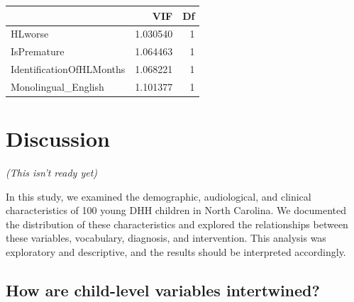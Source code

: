 \documentclass[english,man]{apa6}
\begin{document}
\begin{table}[H]
\centering
\begin{tabular}{l|r|r}
\hline
  & VIF & Df\\
\hline
HLworse & 1.030540 & 1\\
\hline
IsPremature & 1.064463 & 1\\
\hline
IdentificationOfHLMonths & 1.068221 & 1\\
\hline
Monolingual\_English & 1.101377 & 1\\
\hline
\end{tabular}
\end{table}

\hypertarget{discussion}{%
\section{Discussion}\label{discussion}}

\emph{(This isn't ready yet)}

In this study, we examined the demographic, audiological, and clinical characteristics of 100 young DHH children in North Carolina. We documented the distribution of these characteristics and explored the relationships between these variables, vocabulary, diagnosis, and intervention. This analysis was exploratory and descriptive, and the results should be interpreted accordingly.

\hypertarget{how-are-child-level-variables-intertwined}{%
\subsection{How are child-level variables intertwined?}\label{how-are-child-level-variables-intertwined}}
\end{document}
